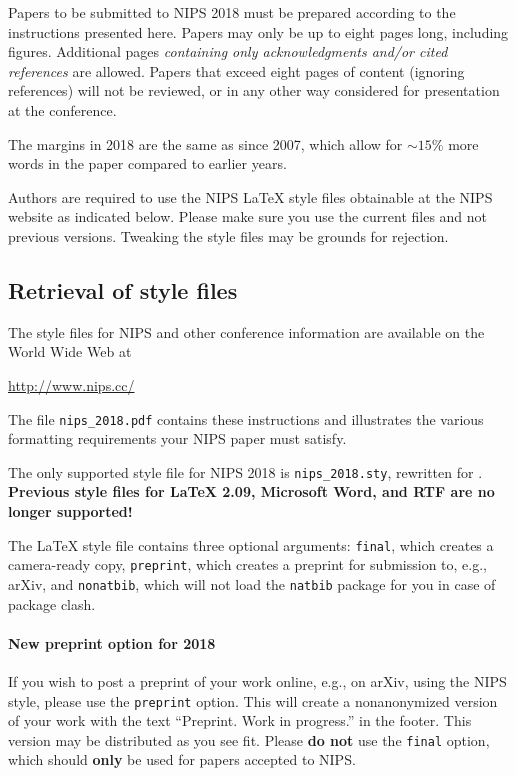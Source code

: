 \documentclass{article}
\begin{document}
Papers to be submitted to NIPS 2018 must be prepared according to the
instructions presented here. Papers may only be up to eight pages
long, including figures. Additional pages \emph{containing only
  acknowledgments and/or cited references} are allowed. Papers that
exceed eight pages of content (ignoring references) will not be
reviewed, or in any other way considered for presentation at the
conference.

The margins in 2018 are the same as since 2007, which allow for
$\sim$$15\%$ more words in the paper compared to earlier years.

Authors are required to use the NIPS \LaTeX{} style files obtainable
at the NIPS website as indicated below. Please make sure you use the
current files and not previous versions. Tweaking the style files may
be grounds for rejection.

\subsection{Retrieval of style files}

The style files for NIPS and other conference information are
available on the World Wide Web at
\begin{center}
  \url{http://www.nips.cc/}
\end{center}
The file \verb+nips_2018.pdf+ contains these instructions and
illustrates the various formatting requirements your NIPS paper must
satisfy.

The only supported style file for NIPS 2018 is \verb+nips_2018.sty+,
rewritten for \LaTeXe{}.  \textbf{Previous style files for \LaTeX{}
  2.09, Microsoft Word, and RTF are no longer supported!}

The \LaTeX{} style file contains three optional arguments: \verb+final+,
which creates a camera-ready copy, \verb+preprint+, which creates a
preprint for submission to, e.g., arXiv, and \verb+nonatbib+, which will
not load the \verb+natbib+ package for you in case of package clash.

\paragraph{New preprint option for 2018}
If you wish to post a preprint of your work online, e.g., on arXiv,
using the NIPS style, please use the \verb+preprint+ option. This will
create a nonanonymized version of your work with the text
``Preprint. Work in progress.''  in the footer. This version may be
distributed as you see fit. Please \textbf{do not} use the
\verb+final+ option, which should \textbf{only} be used for papers
accepted to NIPS.
\end{document}
